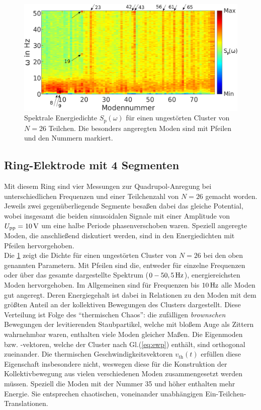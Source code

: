 \documentclass[numbers=noenddot,a4paper,notitlepage,twoside,BCOR15mm]{scrbook}
\newcommand{\ix}[1]{_\text{#1}}
\newcommand{\tilt}[1]{\textit{#1}}
\begin{document}
					\begin{figure}[!h]
						\centering
						\includegraphics[width=\textwidth]{figs/auswertung/manipulation/ersteungestpowerdens.png}
						\caption{Spektrale Energiedichte $S\ix{p}\left(\omega\right)$ für einen ungestörten Cluster von $N=26$ Teilchen. Die besonders angeregten Moden sind mit Pfeilen und den Nummern markiert.}\label{img:powerdensersteungest}
					\end{figure}

	\vspace{-0.4cm}

					\subsection*{Ring-Elektrode mit 4 Segmenten}

						Mit diesem Ring sind vier Messungen zur Quadrupol-Anregung bei unterschiedlichen Frequenzen und einer Teilchenzahl von $N=26$ gemacht worden. Jeweils zwei gegenüberliegende Segmente besaßen dabei das gleiche Potential, wobei insgesamt die beiden sinusoidalen Signale mit einer Amplitude von $U\ix{pp}=\unit[10]{V}$ um eine halbe Periode phasenverschoben waren. Speziell angeregte Moden, die anschließend diskutiert werden, sind in den Energiedichten mit Pfeilen hervorgehoben.\\
						Die \ref{img:powerdensersteungest} zeigt die Dichte für einen ungestörten Cluster von $N=26$ bei den oben genannten Parametern. Mit Pfeilen sind die, entweder für einzelne Frequenzen oder über das gesamte dargestellte Spektrum ($\unit[0-50,5]{Hz}$), energiereichsten Moden hervorgehoben. Im Allgemeinen sind für Frequenzen bis $\unit[10]{Hz}$ alle Moden gut angeregt. Deren Energiegehalt ist dabei in Relationen zu den Moden mit dem größten Anteil an der kollektiven Bewegungen des Clusters dargestellt. Diese Verteilung ist Folge des "`thermischen Chaos"': die zufälligen \tilt{brownschen} Bewegungen der levitierenden Staubpartikel, welche mit bloßem Auge als Zittern wahrnehmbar waren, enthalten viele Moden gleicher Maßen. Die Eigenmoden bzw. -vektoren, welche der Cluster nach Gl.(\ref{eq:ewp}) enthält, sind orthogonal zueinander. Die  thermischen Geschwindigkeitsvektoren $v\ix{th}\left(t\right)$ erfüllen diese Eigenschaft insbesondere nicht, weswegen diese für die Konstruktion der Kollektivbewegung aus vielen verschiedenen Moden zusammengesetzt werden müssen. Speziell die Moden mit der Nummer 35 und höher enthalten mehr Energie. Sie entsprechen chaotischen, voneinander unabhängigen Ein-Teilchen-Translationen.
\end{document}
